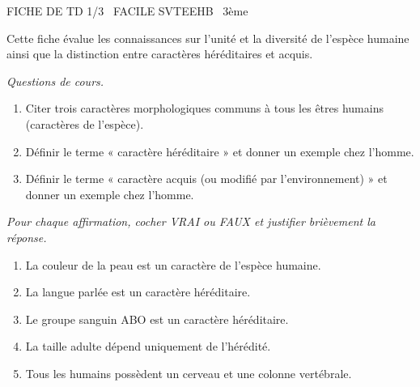 \documentclass[11pt]{article}
\begin{document}
\begin{tcolorbox}[enhanced,colback=popink,colframe=popink,arc=10pt,boxrule=0pt,left=12pt,right=12pt,top=9pt,bottom=9pt]
{\color{white}\popxbold\small FICHE DE TD 1/3 \textbullet\ FACILE \hfill SVTEEHB \textbullet\ 3ème\par}
\end{tcolorbox}
\vspace{4pt}
\noindent Cette fiche évalue les connaissances sur l'unité et la diversité de l'espèce humaine ainsi que la distinction entre caractères héréditaires et acquis.

\begin{exercice}
\emph{Questions de cours.}
\begin{enumerate}
    \item Citer trois caractères morphologiques communs à tous les êtres humains (caractères de l'espèce).
    \item Définir le terme « caractère héréditaire » et donner un exemple chez l'homme.
    \item Définir le terme « caractère acquis (ou modifié par l'environnement) » et donner un exemple chez l'homme.
\end{enumerate}
\end{exercice}

\begin{exercice}
\emph{Pour chaque affirmation, cocher VRAI ou FAUX et justifier brièvement la réponse.}
\begin{enumerate}
    \item La couleur de la peau est un caractère de l'espèce humaine. \hfill {} \hspace{0.5cm} 
    \item La langue parlée est un caractère héréditaire. \hfill {} \hspace{0.5cm} 
    \item Le groupe sanguin ABO est un caractère héréditaire. \hfill {} \hspace{0.5cm} 
    \item La taille adulte dépend uniquement de l'hérédité. \hfill {} \hspace{0.5cm} 
    \item Tous les humains possèdent un cerveau et une colonne vertébrale. \hfill {} \hspace{0.5cm} 
\end{enumerate}
\end{exercice}
\end{document}
